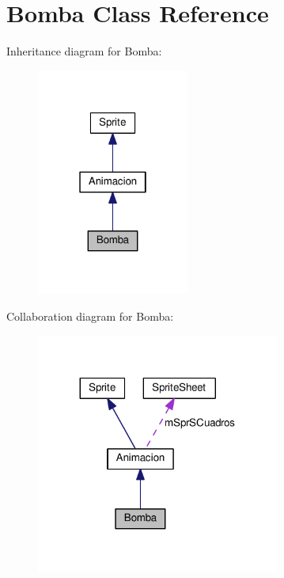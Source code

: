 \hypertarget{class_bomba}{}\section{Bomba Class Reference}
\label{class_bomba}


Inheritance diagram for Bomba\+:\nopagebreak
\begin{figure}[H]
\begin{center}
\leavevmode
\includegraphics[width=142pt]{class_bomba__inherit__graph}
\end{center}
\end{figure}


Collaboration diagram for Bomba\+:\nopagebreak
\begin{figure}[H]
\begin{center}
\leavevmode
\includegraphics[width=227pt]{class_bomba__coll__graph}
\end{center}
\end{figure}
